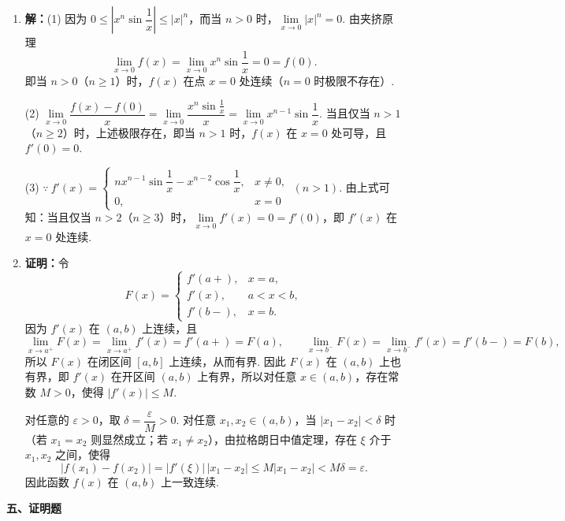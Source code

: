 \documentclass[a4paper,11pt]{ctexart}
\begin{document}
\begin{enumerate}[label=\arabic*., leftmargin=2em, itemsep=0.9em, topsep=0.4em]
  \item \textbf{解：}(1) 因为 $0\le \left|x^n\sin\dfrac{1}{x}\right|\le |x|^n$，而当 $n>0$ 时，$\lim\limits_{x\to 0}|x|^n=0$. 由夹挤原理
  \[
    \lim_{x\to 0}f(x)=\lim_{x\to 0}x^n\sin\frac{1}{x}=0=f(0).
  \]
  即当 $n>0$（$n\ge 1$）时，$f(x)$ 在点 $x=0$ 处连续（$n=0$ 时极限不存在）.

  (2) $\lim\limits_{x\to 0}\dfrac{f(x)-f(0)}{x}=\lim\limits_{x\to 0}\dfrac{x^n\sin\frac{1}{x}}{x}=\lim\limits_{x\to 0}x^{n-1}\sin\dfrac{1}{x}$.
  当且仅当 $n>1$（$n\ge 2$）时，上述极限存在，即当 $n>1$ 时，$f(x)$ 在 $x=0$ 处可导，且 $f'(0)=0$.

  (3) $\because\ f'(x)=\begin{cases} n x^{n-1}\sin\dfrac{1}{x}-x^{n-2}\cos\dfrac{1}{x}, & x\neq 0, \\ 0, & x=0 \end{cases}\ (n>1)$.
  由上式可知：当且仅当 $n>2$（$n\ge 3$）时，$\lim\limits_{x\to 0}f'(x)=0=f'(0)$，即 $f'(x)$ 在 $x=0$ 处连续.

  \item \textbf{证明：}令
  \[
    F(x)=\begin{cases}
      f'(a+), & x=a, \\
      f'(x), & a<x<b, \\
      f'(b-), & x=b.
    \end{cases}
  \]
  因为 $f'(x)$ 在 $(a,b)$ 上连续，且
  \[
    \lim_{x\to a^+}F(x)=\lim_{x\to a^+}f'(x)=f'(a+)=F(a),\qquad
    \lim_{x\to b^-}F(x)=\lim_{x\to b^-}f'(x)=f'(b-)=F(b),
  \]
  所以 $F(x)$ 在闭区间 $[a,b]$ 上连续，从而有界. 因此 $F(x)$ 在 $(a,b)$ 上也有界，即 $f'(x)$ 在开区间 $(a,b)$ 上有界，所以对任意 $x\in(a,b)$，存在常数 $M>0$，使得 $|f'(x)|\le M$.

  对任意的 $\varepsilon>0$，取 $\delta=\dfrac{\varepsilon}{M}>0$. 对任意 $x_1,x_2\in(a,b)$，当 $|x_1-x_2|<\delta$ 时（若 $x_1=x_2$ 则显然成立；若 $x_1\neq x_2$），由拉格朗日中值定理，存在 $\xi$ 介于 $x_1,x_2$ 之间，使得
  \[
    |f(x_1)-f(x_2)|=|f'(\xi)|\,|x_1-x_2|\le M|x_1-x_2|<M\delta=\varepsilon.
  \]
  因此函数 $f(x)$ 在 $(a,b)$ 上一致连续.
\end{enumerate}

\vspace{0.6em}
\textbf{五、证明题}
\end{document}

